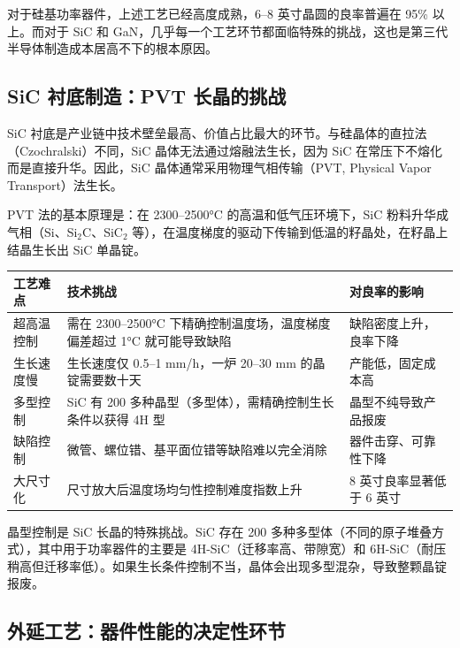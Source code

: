 对于硅基功率器件，上述工艺已经高度成熟，6–8 英寸晶圆的良率普遍在 95\% 以上。而对于 SiC 和 GaN，几乎每一个工艺环节都面临特殊的挑战，这也是第三代半导体制造成本居高不下的根本原因。

\subsection{SiC 衬底制造：PVT 长晶的挑战}

SiC 衬底是产业链中技术壁垒最高、价值占比最大的环节。与硅晶体的直拉法（Czochralski）不同，SiC 晶体无法通过熔融法生长，因为 SiC 在常压下不熔化而是直接升华。因此，SiC 晶体通常采用物理气相传输（PVT, Physical Vapor Transport）法生长。

PVT 法的基本原理是：在 2300–2500°C 的高温和低气压环境下，SiC 粉料升华成气相（Si、Si$_2$C、SiC$_2$ 等），在温度梯度的驱动下传输到低温的籽晶处，在籽晶上结晶生长出 SiC 单晶锭。

\begin{exhibitbox}
\centering
\small
\begin{tabularx}{\textwidth}{L{2.8cm} X L{2.5cm}}
\toprule
\textbf{工艺难点} & \textbf{技术挑战} & \textbf{对良率的影响} \\
\midrule
超高温控制 & 需在 2300–2500°C 下精确控制温度场，温度梯度偏差超过 1°C 就可能导致缺陷 & 缺陷密度上升，良率下降 \\
生长速度慢 & 生长速度仅 0.5–1 mm/h，一炉 20–30 mm 的晶锭需要数十天 & 产能低，固定成本高 \\
多型控制 & SiC 有 200 多种晶型（多型体），需精确控制生长条件以获得 4H 型 & 晶型不纯导致产品报废 \\
缺陷控制 & 微管、螺位错、基平面位错等缺陷难以完全消除 & 器件击穿、可靠性下降 \\
大尺寸化 & 尺寸放大后温度场均匀性控制难度指数上升 & 8 英寸良率显著低于 6 英寸 \\
\bottomrule
\end{tabularx}
\end{exhibitbox}

晶型控制是 SiC 长晶的特殊挑战。SiC 存在 200 多种多型体（不同的原子堆叠方式），其中用于功率器件的主要是 4H-SiC（迁移率高、带隙宽）和 6H-SiC（耐压稍高但迁移率低）。如果生长条件控制不当，晶体会出现多型混杂，导致整颗晶锭报废。

\subsection{外延工艺：器件性能的决定性环节}


